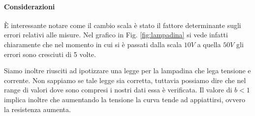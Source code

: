 \paragraph{Considerazioni\\}
È interessante notare come il cambio scala è stato il fattore determinante sugli errori relativi alle misure. Nel grafico in Fig. \ref{fig:lampadina} si vede infatti chiaramente che nel momento in cui si è passati dalla scala $10V$ a quella $50V$ gli errori sono cresciuti di 5 volte.
 
Siamo inoltre riusciti ad ipotizzare una legge per la lampadina che lega tensione e corrente. Non sappiamo se tale legge sia corretta, tuttavia possiamo dire che nel range di valori dove sono compresi i nostri dati essa è verificata. Il valore di $b<1$ implica inoltre che aumentando la tensione la curva tende ad appiattirsi, ovvero la resistenza aumenta. 